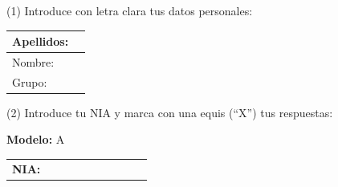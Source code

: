 \documentclass[a4paper,11pt]{article}
\begin{document}
\vspace{0.2cm}


\begin{center}
(1) Introduce con letra clara tus datos personales:
\end{center}

\begin{center}
\large

\begin{tabular}{|l|p{12cm}|}
\hline
Apellidos:   &  \\
\hline
Nombre: &    \\
\hline
Grupo:   &  \\
\hline
\end{tabular}
\end{center}

\vspace{0.2cm}

\begin{center}
(2) Introduce tu NIA y marca con una equis (``X'') tus respuestas:
\end{center}

\begin{center}
\large
\textbf{Modelo:} A
\end{center}

\begin{center}
\Large
\begin{tabular}{l|p{0.3cm}|p{0.3cm}|p{0.3cm}|p{0.3cm}|p{0.3cm}|p{0.3cm}|p{0.3cm}|p{0.3cm}|p{0.3cm}|}
\cline{2-10}
\textbf{NIA:} & & & & & & & & & \\
\cline{2-10}
\end{tabular}
\end{center}
\end{document}
